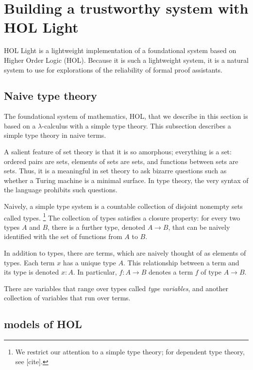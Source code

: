 \documentclass[brochure,english,12pt]{bourbaki}
\theoremstyle{plain}
\def\op#1{{\operatorname{#1}}}
\begin{document}
\section{Building a trustworthy system with HOL Light}

\def\bool{\op{bool}}
\def\Fun{\op{Fun}}

HOL Light is a lightweight implementation of a foundational system
based on Higher Order Logic (HOL).  Because it is such a lightweight system,
it is a natural system to use for explorations of the reliability of formal proof assistants.



\subsection{Naive type theory}



The foundational system of mathematics, HOL, that we describe in this section is based
on a $\lambda$-calculus with a simple type theory.  This subsection describes a simple type theory in
naive terms.  

A salient feature of set theory is that it is so amorphous; everything is a set:
ordered pairs are sets, elements of sets are sets,
and functions between sets are sets.
Thus, it is a meaningful in set theory to ask bizarre questions such as whether 
a Turing machine is a minimal surface.  In type theory,
the very syntax of the language prohibits such questions.

Naively, a simple type system is a countable collection of disjoint nonempty sets called types.
\footnote{We restrict our attention to a simple type theory; for dependent type theory, see [cite].}
The collection of types satisfies a closure property: for every two types $A$ and $B$,
there  is a further type, denoted $A\to B$, that can be naively identified with the set of functions from
$A$ to $B$.  

In addition to types, there are terms, which are naively thought of as elements of types.
Each term $x$ has a unique type $A$.  This relationship between a term and its type is denoted $x:A$.
In particular, $f:A\to B$ denotes a term $f$ of type $A\to B$.

There are variables that range over types called {\it type variables}, and another
collection of variables that run over terms.


\subsection{models of HOL}
\end{document}
